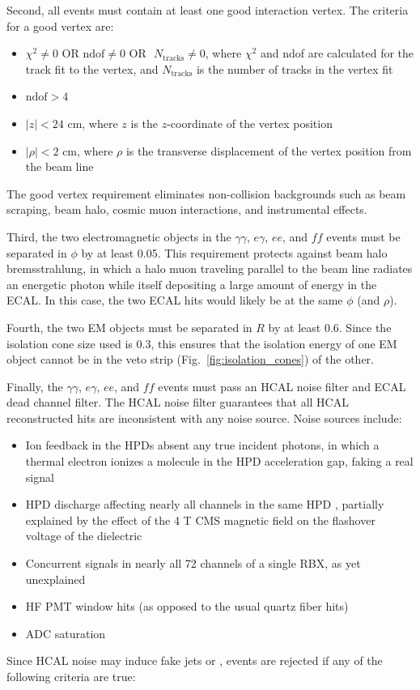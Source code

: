 \documentclass[dissertation.tex]{subfiles}
\begin{document}
Second, all events must contain at least one good interaction vertex.  The criteria for a good vertex are:

\begin{itemize}
\item $\chi^{2} \neq 0\mbox{ OR}\mbox{ ndof} \neq 0\mbox{ OR}\mbox{ }N_{\mathrm{tracks}} \neq 0$, where $\chi^{2}$ and ndof are calculated for the track fit to the vertex, and $N_{\mathrm{tracks}}$ is the number of tracks in the vertex fit
\item $\mbox{ndof} > 4$
\item $|z| < 24$ cm, where $z$ is the $z$-coordinate of the vertex position
\item $|\rho| < 2$ cm, where $\rho$ is the transverse displacement of the vertex position from the beam line
\end{itemize}
%
The good vertex requirement eliminates non-collision backgrounds such as beam scraping, beam halo, cosmic muon interactions, and instrumental effects.

Third, the two electromagnetic objects in the $\gamma\gamma$, $e\gamma$, $ee$, and $\mathit{ff}$ events must be separated in $\phi$ by at least 0.05.  This requirement protects against beam halo bremsstrahlung, in which a halo muon traveling parallel to the beam line radiates an energetic photon while itself depositing a large amount of energy in the ECAL.  In this case, the two ECAL hits would likely be at the same $\phi$ (and $\rho$).

Fourth, the two EM objects must be separated in $R$ by at least 0.6.  Since the isolation cone size used is 0.3, this ensures that the isolation energy of one EM object cannot be in the veto strip (Fig.~\ref{fig:isolation_cones}) of the other.

Finally, the $\gamma\gamma$, $e\gamma$, $ee$, and $\mathit{ff}$ events must pass an HCAL noise filter and ECAL dead channel filter.  The HCAL noise filter guarantees that all HCAL reconstructed hits are inconsistent with any noise source.  Noise sources \cite{1748-0221-5-03-T03014} include:

\begin{itemize}
\item Ion feedback in the HPDs absent any true incident photons, in which a thermal electron ionizes a molecule in the HPD acceleration gap, faking a real signal
\item HPD discharge affecting nearly all channels in the same HPD \cite{HCAL_noise_AN}, partially explained by the effect of the 4 T CMS magnetic field on the flashover voltage of the dielectric \cite{75200}
\item Concurrent signals in nearly all 72 channels of a single RBX, as yet unexplained
\item HF PMT window hits (as opposed to the usual quartz fiber hits)
\item ADC saturation
\end{itemize}
%
Since HCAL noise may induce fake jets or \MET, events are rejected if any of the following criteria are true:
\end{document}
